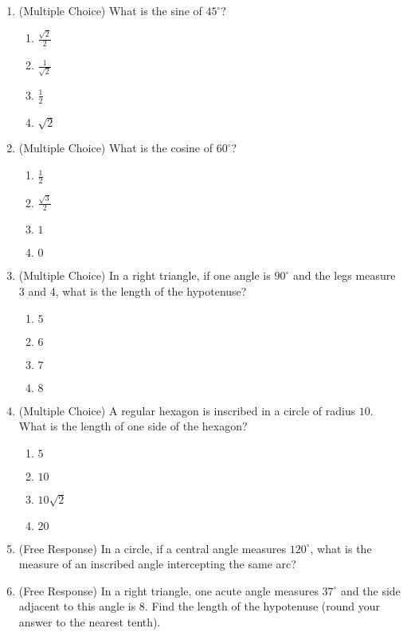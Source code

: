 \documentclass[12pt]{article}
\begin{document}
\begin{enumerate}[label=\textbf{Question \arabic*:}]
  \item (Multiple Choice) What is the sine of \(45^\circ\)?
    \begin{enumerate}[label=(\Alph*)]
      \item \(\frac{\sqrt{2}}{2}\)
      \item \(\frac{1}{\sqrt{2}}\)
      \item \(\frac{1}{2}\)
      \item \(\sqrt{2}\)
    \end{enumerate}
  
  \item (Multiple Choice) What is the cosine of \(60^\circ\)?
    \begin{enumerate}[label=(\Alph*)]
      \item \(\frac{1}{2}\)
      \item \(\frac{\sqrt{3}}{2}\)
      \item \(1\)
      \item \(0\)
    \end{enumerate}
  
  \item (Multiple Choice) In a right triangle, if one angle is \(90^\circ\) and the legs measure \(3\) and \(4\), what is the length of the hypotenuse?
    \begin{enumerate}[label=(\Alph*)]
      \item \(5\)
      \item \(6\)
      \item \(7\)
      \item \(8\)
    \end{enumerate}
  
  \item (Multiple Choice) A regular hexagon is inscribed in a circle of radius \(10\). What is the length of one side of the hexagon?
    \begin{enumerate}[label=(\Alph*)]
      \item \(5\)
      \item \(10\)
      \item \(10\sqrt{2}\)
      \item \(20\)
    \end{enumerate}
  
  \item (Free Response) In a circle, if a central angle measures \(120^\circ\), what is the measure of an inscribed angle intercepting the same arc?
  
  \item (Free Response) In a right triangle, one acute angle measures \(37^\circ\) and the side adjacent to this angle is \(8\). Find the length of the hypotenuse (round your answer to the nearest tenth).

\end{enumerate}
\end{document}
